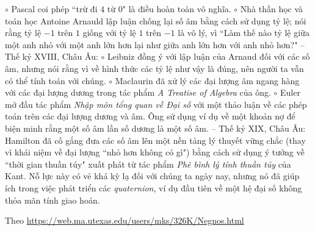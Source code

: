 \begin{multicols}{2}
	\vskip 0.1cm
	$\circ$ Pascal coi phép ``trừ đi $4$ từ $0$" là điều hoàn toàn vô nghĩa.
	\vskip 0.1cm
	$\circ$ Nhà thần học và toán học Antoine Arnauld lập luận chống lại số âm bằng cách sử dụng tỷ lệ; nói rằng tỷ lệ $-1$ trên $1$ giống với tỷ lệ $1$ trên $-1$ là vô lý, vì ``Làm thế nào tỷ lệ giữa một anh nhỏ với một anh lớn hơn lại như giữa anh lớn hơn với anh nhỏ hơn?"
	\vskip 0.1cm
	-- Thế kỷ XVIII, Châu Âu:
	\vskip 0.1cm
	$\circ$ Leibniz đồng ý với lập luận của Arnaud đối với các số âm, nhưng nói rằng vì về hình thức các tỷ lệ như vậy là đúng, nên người ta vẫn có thể tính toán với chúng.
	\vskip 0.1cm
	$\circ$ Maclaurin đã xử lý các đại lượng âm ngang hàng với các đại lượng dương trong tác phẩm \textit{A Treatise of Algebra} của ông.
	\vskip 0.1cm 
	$\circ$ Euler mở đầu tác phẩm \textit{Nhập môn tổng quan về Đại số} với một thảo luận về các phép toán trên các đại lượng dương và âm. Ông sử dụng ví dụ về một khoản nợ để biện minh rằng một số âm lần số dương là một số âm.  
	\vskip 0.1cm
	-- Thế kỷ XIX, Châu Âu: Hamilton đã cố gắng đưa các số âm lên một nền tảng lý thuyết vững chắc (thay vì khái niệm về đại lượng ``nhỏ hơn không có gì") bằng cách sử dụng ý tưởng về ``thời gian thuần túy" xuất phát từ tác phẩm \textit{Phê bình lý tính thuần túy} của Kant. Nỗ lực này có vẻ khá kỳ lạ đối với chúng ta ngày nay, nhưng nó đã giúp ích trong việc phát triển các \textit{quaternion}, ví dụ đầu tiên về một hệ đại số không thỏa mãn tính giao hoán.
	\begin{flushright}
		Theo \url{https://web.ma.utexas.edu/users/mks/326K/Negnos.html}
	\end{flushright}
\end{multicols}